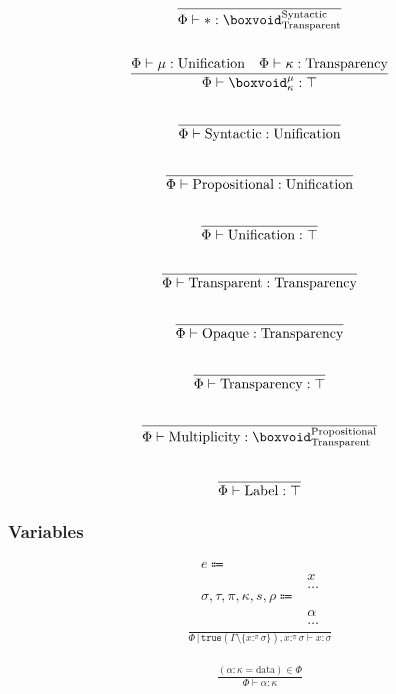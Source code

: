 \documentclass {article}
\begin{document}
\begin{gather*}
\frac
{}
{\Phi \vdash * : \boxvoid^{\text{Syntactic}}_{\text{Transparent}}} \\
\\
\frac
{\Phi \vdash \mu : \text{Unification} \quad \Phi \vdash \kappa : \text{Transparency}}
{\Phi \vdash \boxvoid^\mu_{\kappa} : \top} \\
\\
\frac
{}
{\Phi \vdash \text{Syntactic} : \text{Unification}} \\
\\
\frac
{}
{\Phi \vdash \text{Propositional} : \text{Unification}} \\
\\
\frac
{}
{\Phi \vdash \text{Unification} : \top} \\
\\
\frac
{}
{\Phi \vdash \text{Transparent} : \text{Transparency}} \\
\\
\frac
{}
{\Phi \vdash \text{Opaque} : \text{Transparency}} \\
\\
\frac
{}
{\Phi \vdash \text{Transparency} : \top} \\
\\
\frac
{}
{\Phi \vdash \text{Multiplicity} : \boxvoid^{\text{Propositional}}_{\text{Transparent}}} \\
\\
\frac
{}
{\Phi \vdash \text{Label} : \top}
\end{gather*}

\subsubsection{Variables}
\begin{align*}
e \Coloneqq & \\
& x \tag{Variable} \\
& \dots \\
\sigma, \tau, \pi, \kappa, s, \rho \Coloneqq & \\
& \alpha \tag{Type Variable} \\
& \dots
\end{align*}
\begin{gather*}
\frac
{}
{\Phi \, | \, \texttt{true} (\Gamma \setminus \{x :^\pi \sigma\}), x :^\pi \sigma  \vdash x : \sigma}
\end{gather*}

\begin{gather*}
\frac
{(\alpha : \kappa = \text{data} ) \in \Phi}
{\Phi \vdash \alpha : \kappa}
\end{gather*}
\end{document}
